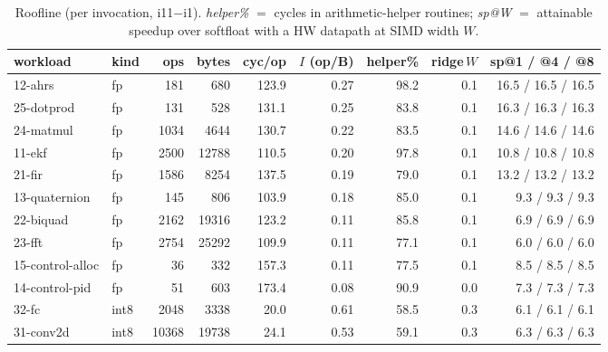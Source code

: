\documentclass[11pt]{article}
\begin{document}
\begin{table}[ht]\centering\small
\caption{Roofline (per invocation, i11$-$i1). \emph{helper\%} $=$ cycles in arithmetic-helper routines;
\emph{sp@W} $=$ attainable speedup over softfloat with a HW datapath at SIMD width $W$.}\label{tab:roof}
\begin{tabular}{@{}llrrrrrrr@{}}
\toprule
workload & kind & ops & bytes & cyc/op & $I$ (op/B) & helper\% & ridge\,$W$ & sp@1 / @4 / @8 \\
\midrule
12-ahrs & fp & 181 & 680 & 123.9 & 0.27 & 98.2 & 0.1 & 16.5 / 16.5 / 16.5 \\
25-dotprod & fp & 131 & 528 & 131.1 & 0.25 & 83.8 & 0.1 & 16.3 / 16.3 / 16.3 \\
24-matmul & fp & 1034 & 4644 & 130.7 & 0.22 & 83.5 & 0.1 & 14.6 / 14.6 / 14.6 \\
11-ekf & fp & 2500 & 12788 & 110.5 & 0.20 & 97.8 & 0.1 & 10.8 / 10.8 / 10.8 \\
21-fir & fp & 1586 & 8254 & 137.5 & 0.19 & 79.0 & 0.1 & 13.2 / 13.2 / 13.2 \\
13-quaternion & fp & 145 & 806 & 103.9 & 0.18 & 85.0 & 0.1 & 9.3 / 9.3 / 9.3 \\
22-biquad & fp & 2162 & 19316 & 123.2 & 0.11 & 85.8 & 0.1 & 6.9 / 6.9 / 6.9 \\
23-fft & fp & 2754 & 25292 & 109.9 & 0.11 & 77.1 & 0.1 & 6.0 / 6.0 / 6.0 \\
15-control-alloc & fp & 36 & 332 & 157.3 & 0.11 & 77.5 & 0.1 & 8.5 / 8.5 / 8.5 \\
14-control-pid & fp & 51 & 603 & 173.4 & 0.08 & 90.9 & 0.0 & 7.3 / 7.3 / 7.3 \\
32-fc & int8 & 2048 & 3338 & 20.0 & 0.61 & 58.5 & 0.3 & 6.1 / 6.1 / 6.1 \\
31-conv2d & int8 & 10368 & 19738 & 24.1 & 0.53 & 59.1 & 0.3 & 6.3 / 6.3 / 6.3 \\
\bottomrule
\end{tabular}
\end{table}
\end{document}
